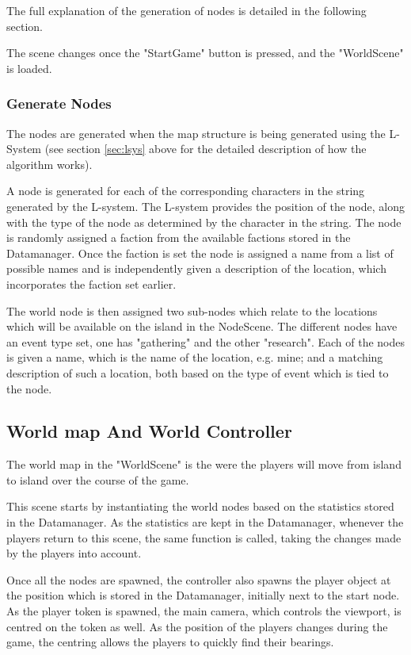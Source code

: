 The full explanation of the generation of nodes is detailed in the following section.

The scene changes once the "StartGame" button is pressed, and the "WorldScene" is loaded.

\subsubsection{Generate Nodes}
The nodes are generated when the map structure is being generated using the L-System (see section \ref{sec:lsys} above for the detailed description of how the algorithm works).

A node is generated for each of the corresponding characters in the string generated by the L-system.
The L-system provides the position of the node, along with the type of the node as determined by the character in the string. 
The node is randomly assigned a faction from the available factions stored in the Datamanager. Once the faction is set the node is assigned a name from a list of possible names and is independently given a description of the location, which incorporates the faction set earlier.

The world node is then assigned two sub-nodes which relate to the locations which will be available on the island in the NodeScene. The different nodes have an event type set, one has "gathering" and the other "research".
Each of the nodes is given a name, which is the name of the location, e.g. mine; and a matching description of such a location, both based on the type of event which is tied to the node.

\subsection{World map And World Controller}
The world map in the "WorldScene" is the were the players will move from island to island over the course of the game. 

This scene starts by instantiating the world nodes based on the statistics stored in the Datamanager. As the statistics are kept in the Datamanager, whenever the players return to this scene, the same function is called, taking the changes made by the players into account. 

Once all the nodes are spawned, the controller also spawns the player object at the position which is stored in the Datamanager, initially next to the start node. 
As the player token is spawned, the main camera, which controls the viewport, is centred on the token as well. As the position of the players changes during the game, the centring allows the players to quickly find their bearings.

